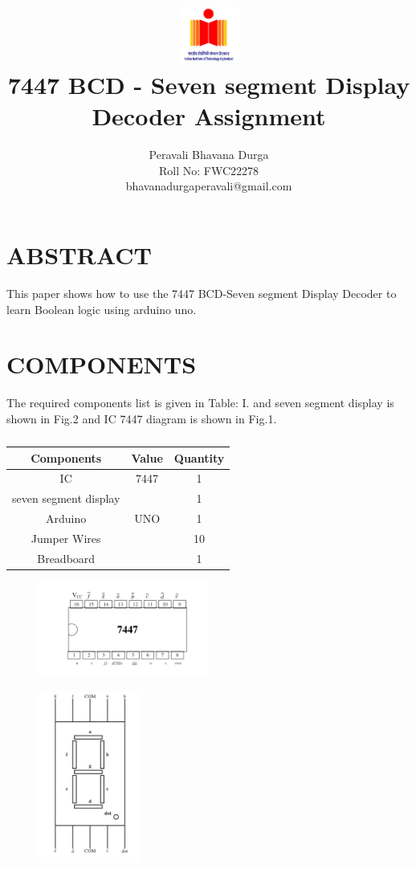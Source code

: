 \documentclass[conference]{IEEEtran}
\title{
\vspace{1cm}
{\includegraphics[width=0.15\textwidth]{iith.jpg} \\ 7447 BCD - Seven segment Display Decoder Assignment} }
\author{Peravali Bhavana Durga\\ Roll No: FWC22278 \\ bhavanadurgaperavali@gmail.com}
\begin{document}
\maketitle
 \section {ABSTRACT}
 This paper shows how to use the 7447 BCD-Seven segment Display Decoder to learn Boolean logic using arduino uno.

\section{COMPONENTS}
The required components list is given in Table: I. and seven segment display is shown in Fig.2 and IC 7447 diagram is shown in Fig.1.
\vspace{0.3cm}
 \begin{table} [htbp]
\centering
\begin{tabular}{| c | c | c |} \hline
Components & Value & Quantity \\\hline
IC & 7447 & 1 \\ \hline
seven segment display & & 1\\ \hline
Arduino & UNO & 1 \\ \hline
Jumper Wires &  & 10 \\ \hline
Breadboard & & 1 \\
\hline
\end{tabular}
\vspace{0.3cm}
\caption{\label{tab:widgets}}
\end{table}

\begin{figure}[h]
\centering
\includegraphics[width=0.5\textwidth]{imm.jpg}
\caption{\label{fig-1:Gates}}
\end{figure}

\begin{figure}[h]
\centering
\includegraphics[width=0.3\textwidth]{seg.jpg}
\caption{\label{fig-2:Gates}}
\end{figure}
\end{document}
